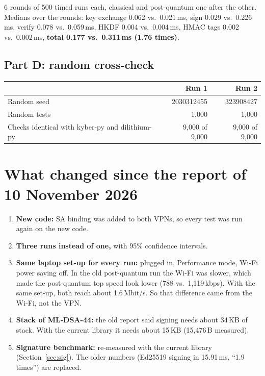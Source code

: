 \documentclass[10pt,a4paper]{article}
\begin{document}
6 rounds of 500 timed runs each, classical and post-quantum one after the other. Medians over the rounds:
key exchange 0.062 vs.\ 0.021\,ms, sign 0.029 vs.\ 0.226\,ms, verify 0.078 vs.\ 0.059\,ms, HKDF 0.004
vs.\ 0.004\,ms, HMAC tags 0.002 vs.\ 0.002\,ms, \textbf{total 0.177 vs.\ 0.311\,ms (1.76 times)}.

\subsection*{Part D: random cross-check}

\begin{table}[H]\centering\small
\begin{tabular}{lrr}
\toprule
 & Run 1 & Run 2 \\
\midrule
Random seed & 2030312455 & 323908427 \\
Random tests & 1,000 & 1,000 \\
Checks identical with kyber-py and dilithium-py & 9,000 of 9,000 & 9,000 of 9,000 \\
\bottomrule
\end{tabular}
\end{table}

\section*{What changed since the report of 10 November 2026}

\begin{enumerate}[nosep]
  \item \textbf{New code:} SA binding was added to both VPNs, so every test was run again on the new code.
  \item \textbf{Three runs instead of one,} with 95\% confidence intervals.
  \item \textbf{Same laptop set-up for every run:} plugged in, Performance mode, Wi-Fi power saving off.
        In the old post-quantum run the Wi-Fi was slower, which made the post-quantum top speed look
        lower (788 vs.\ 1,119\,kbps). With the same set-up, both reach about 1.6\,Mbit/s. So that
        difference came from the Wi-Fi, not the VPN.
  \item \textbf{Stack of ML-DSA-44:} the old report said signing needs about 34\,KB of stack. With the
        current library it needs about 15\,KB (15,476\,B measured).
  \item \textbf{Signature benchmark:} re-measured with the current library (Section~\ref{sec:sig}).
        The older numbers (Ed25519 signing in 15.91\,ms, ``1.9 times'') are replaced.
\end{enumerate}
\end{document}
